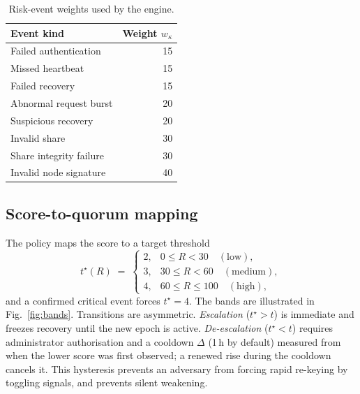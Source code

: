 \documentclass[conference]{IEEEtran}
\begin{document}
\begin{table}[t]
\centering
\caption{Risk-event weights used by the engine.}
\label{tab:weights}
\begin{tabular}{@{}lr@{}}
\toprule
Event kind & Weight $w_\kappa$ \\
\midrule
Failed authentication            & 15 \\
Missed heartbeat                 & 15 \\
Failed recovery                  & 15 \\
Abnormal request burst           & 20 \\
Suspicious recovery              & 20 \\
Invalid share                    & 30 \\
Share integrity failure          & 30 \\
Invalid node signature           & 40 \\
\bottomrule
\end{tabular}
\end{table}

\subsection{Score-to-quorum mapping}
The policy maps the score to a target threshold
\begin{equation}
  t^\star(R) \;=\;
  \begin{cases}
    2, & 0 \le R < 30 \quad (\text{low}),\\
    3, & 30 \le R < 60 \quad (\text{medium}),\\
    4, & 60 \le R \le 100 \quad (\text{high}),
  \end{cases}
  \label{eq:policy}
\end{equation}
and a confirmed critical event forces $t^\star=4$. The bands are illustrated in Fig.~\ref{fig:bands}. Transitions are asymmetric. \emph{Escalation} ($t^\star > t$) is immediate and freezes recovery until the new epoch is active. \emph{De-escalation} ($t^\star < t$) requires administrator authorisation and a cooldown $\Delta$ (1\,h by default) measured from when the lower score was first observed; a renewed rise during the cooldown cancels it. This hysteresis prevents an adversary from forcing rapid re-keying by toggling signals, and prevents silent weakening.
\end{document}
